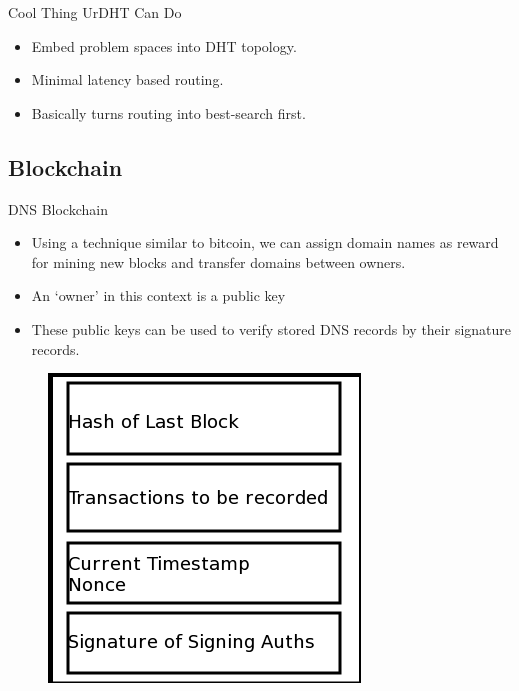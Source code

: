 \documentclass[11pt]{beamer}
\begin{document}

\begin{frame}{Cool Thing UrDHT Can Do}
	\begin{itemize}
		\item Embed problem spaces into DHT topology.
		\item Minimal latency based routing.
		\item Basically turns routing into best-search first.
		
	\end{itemize}
\end{frame}



\subsection{Blockchain}

\begin{frame}{DNS Blockchain}
	\begin{itemize}
		\item Using a technique similar to bitcoin, we can assign domain names as reward for mining new blocks and transfer domains between owners.
		
		\item An `owner' in this context is a public key
		
		\item These public keys can be used to verify stored DNS records by their signature records.
	\end{itemize}
	
	
	\begin{figure}
		\centering
		\includegraphics[width=0.3\linewidth]{namecoin_block}
		\label{fig:blockchain}
	\end{figure}
	
\end{frame}
\end{document}
